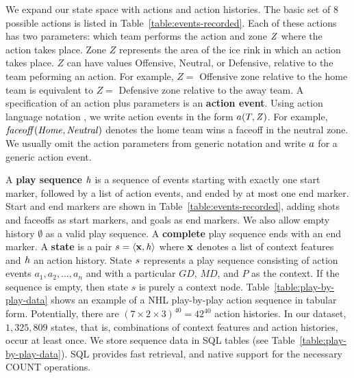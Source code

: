 \documentclass[]{article}
\begin{document}
We expand our state space with actions and action histories. The basic set of 8 possible actions is listed in Table~\ref{table:events-recorded}. Each of these actions has two parameters: which team performs the action and zone $\it{Z}$ where the action takes place. Zone $Z$ represents the area of the ice rink in which an action takes place. $Z$ can have values Offensive, Neutral, or Defensive, relative to the team peforming an action. For example, $Z = $ Offensive zone relative to the home team is equivalent to $Z = $ Defensive zone relative to the away team. A specification of an action plus parameters is an \textbf{action event}. Using action language notation \citep{bib:LevesquePirriReiter98}, we write action events in the form $a(T,\it{Z})$. For example, $\it{faceoff}(\it{Home},\it{Neutral})$ denotes the home team wins a faceoff in the neutral zone. We usually omit the action parameters from generic notation and write $a$ for a generic action event.

A \textbf{play sequence} $\it{h}$ is a sequence of events starting with exactly one start marker, followed by a list of action events, and ended by at most one end marker.  Start and end markers are shown in Table~\ref{table:events-recorded}, adding shots and faceoffs as start markers, and goals as end markers. We also allow empty history $\emptyset$ as a valid play sequence. A \textbf{complete} play sequence ends with an end marker.
A \textbf{state} is a pair $s = \langle \mathbf{x}, \it{h} \rangle$ where $\mathbf{x}$ denotes a list of context features and $\it{h}$ an action history. State $s$ represents a play sequence consisting of action events $a_1,a_2,\ldots,a_n$ and with a particular $GD$, $MD$, and $P$ as the context. If the sequence is empty, then state $s$ is purely a context node. Table~\ref{table:play-by-play-data} shows an example of a NHL play-by-play action sequence in tabular form. Potentially, there are $(7 \times 2 \times 3)^{40} = 42^{40}$ action histories. In our dataset, $1,325,809$ states, that is, combinations of context features and action histories, occur at least once. %
We store sequence data in SQL tables (see Table~\ref{table:play-by-play-data}). SQL provides fast retrieval,  and  native support for the necessary COUNT operations.
\end{document}
